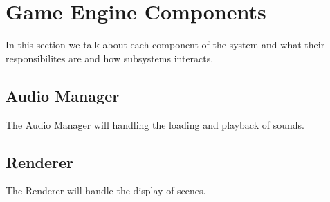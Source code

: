 

\section{Game Engine Components}

In this section we talk about each component of the system and what their responsibilites are and how subsystems interacts.

\subsection{Audio Manager}

The Audio Manager will handling the loading and playback of sounds.

\subsection{Renderer}

The Renderer will handle the display of scenes.
